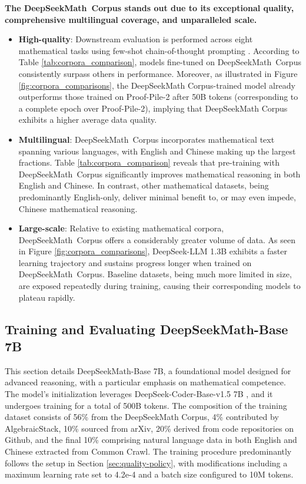 \textbf{The DeepSeekMath~Corpus stands out due to its exceptional quality, comprehensive multilingual coverage, and unparalleled scale.}

\begin{itemize}[topsep=0pt]
    \item \textbf{High-quality}:
    Downstream evaluation is performed across eight mathematical tasks using few-shot chain-of-thought prompting \cite{cot}. According to Table \ref{tab:corpora_comparison}, models fine-tuned on DeepSeekMath~Corpus consistently surpass others in performance. Moreover, as illustrated in Figure \ref{fig:corpora_comparisons}, the DeepSeekMath Corpus-trained model already outperforms those trained on Proof-Pile-2 after 50B tokens (corresponding to a complete epoch over Proof-Pile-2), implying that DeepSeekMath Corpus exhibits a higher average data quality.
    \item \textbf{Multilingual}:
    DeepSeekMath~Corpus incorporates mathematical text spanning various languages, with English and Chinese making up the largest fractions. Table \ref{tab:corpora_comparison} reveals that pre-training with DeepSeekMath~Corpus significantly improves mathematical reasoning in both English and Chinese. In contrast, other mathematical datasets, being predominantly English-only, deliver minimal benefit to, or may even impede, Chinese mathematical reasoning.
    \item \textbf{Large-scale}:
    Relative to existing mathematical corpora, DeepSeekMath~Corpus offers a considerably greater volume of data. As seen in Figure \ref{fig:corpora_comparisons}, DeepSeek-LLM 1.3B exhibits a faster learning trajectory and sustains progress longer when trained on DeepSeekMath~Corpus. Baseline datasets, being much more limited in size, are exposed repeatedly during training, causing their corresponding models to plateau rapidly.
\end{itemize}

\subsection{Training and Evaluating DeepSeekMath-Base 7B}

This section details DeepSeekMath-Base 7B, a foundational model designed for advanced reasoning, with a particular emphasis on mathematical competence. The model's initialization leverages DeepSeek-Coder-Base-v1.5 7B \citep{deepseek-coder}, and it undergoes training for a total of 500B tokens. The composition of the training dataset consists of 56\% from the DeepSeekMath Corpus, 4\% contributed by AlgebraicStack, 10\% sourced from arXiv, 20\% derived from code repositories on Github, and the final 10\% comprising natural language data in both English and Chinese extracted from Common Crawl. The training procedure predominantly follows the setup in Section \ref{sec:quality-policy}, with modifications including a maximum learning rate set to 4.2e-4 and a batch size configured to 10M tokens.

